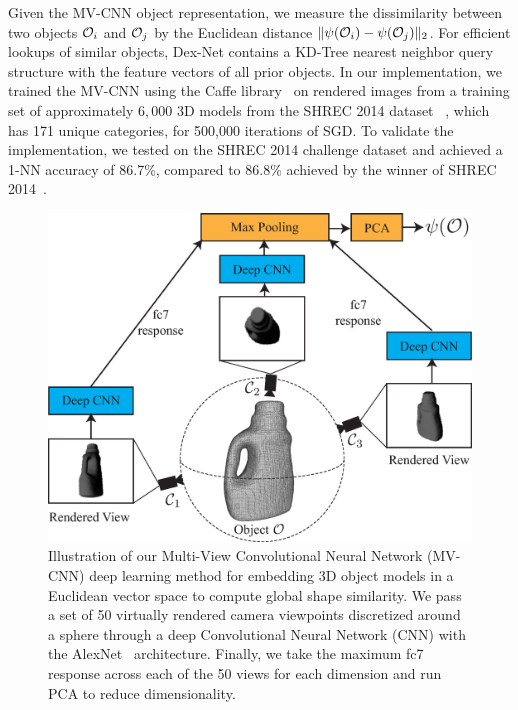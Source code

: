 Given the MV-CNN object representation, we measure the dissimilarity between two objects $\mathcal{O}_i$ and $\mathcal{O}_j$ by the Euclidean distance $\| \psi(\mathcal{O}_i) - \psi(\mathcal{O}_j) \|_2$.
For efficient lookups of similar objects, Dex-Net contains a KD-Tree nearest neighbor query structure with the feature vectors of all prior objects.
In our implementation, we trained the MV-CNN using the Caffe library~\cite{jia2014caffe} on rendered images from a training set of approximately $6,000$ 3D models from the SHREC 2014 dataset ~\cite{li2015comparison}, which has 171 unique categories, for 500,000 iterations of SGD.
To validate the implementation, we tested on the SHREC 2014 challenge dataset and achieved a 1-NN accuracy of 86.7\%, compared to 86.8\% achieved by the winner of SHREC 2014~\cite{li2015comparison}.

\begin{figure}[t!]
\centering
\includegraphics[scale=0.275]{figures/illustrations/cnn_model.eps}
\caption{Illustration of our Multi-View Convolutional Neural Network (MV-CNN) deep learning method for embedding 3D object models in a Euclidean vector space to compute global shape similarity. We pass a set of 50 virtually rendered camera viewpoints discretized around a sphere through a deep Convolutional Neural Network (CNN) with the AlexNet~\cite{krizhevsky2012imagenet} architecture. Finally, we take the maximum fc7 response across each of the 50 views for each dimension and run PCA to reduce dimensionality.}
\vspace*{-15pt}
\end{figure}

